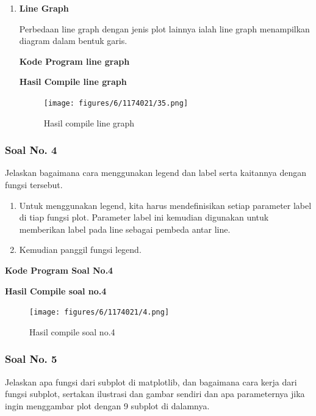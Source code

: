 \begin{enumerate}
	\item \textbf{Line Graph}
	
	Perbedaan line graph dengan jenis plot lainnya ialah line graph menampilkan diagram dalam bentuk garis.
	
	\textbf{Kode Program line graph}
	
	
	
	\textbf{Hasil Compile line graph}
	
	\begin{figure}[H]
		\texttt{[image: figures/6/1174021/35.png]}
		\centering
		\caption{Hasil compile line graph}
	\end{figure}
	
\end{enumerate}

\subsubsection{Soal No. 4}
\hfill \break
Jelaskan bagaimana cara menggunakan legend dan label serta kaitannya dengan fungsi tersebut.

\begin{enumerate}
	\item Untuk menggunakan legend, kita harus mendefinisikan setiap parameter label di tiap fungsi plot. Parameter label ini kemudian digunakan untuk memberikan label pada line sebagai pembeda antar line.
	
	
	
	\item Kemudian panggil fungsi legend.
	
	
\end{enumerate}

\hfill \break
\textbf{Kode Program Soal No.4}



\hfill \break
\textbf{Hasil Compile soal no.4}

\begin{figure}[H]
	\texttt{[image: figures/6/1174021/4.png]}
	\centering
	\caption{Hasil compile soal no.4}
\end{figure}

\subsubsection{Soal No. 5}
\hfill \break
Jelaskan apa fungsi dari subplot di matplotlib, dan bagaimana cara kerja dari fungsi subplot, sertakan ilustrasi dan gambar sendiri dan apa parameternya jika ingin menggambar plot dengan 9 subplot di dalamnya.


